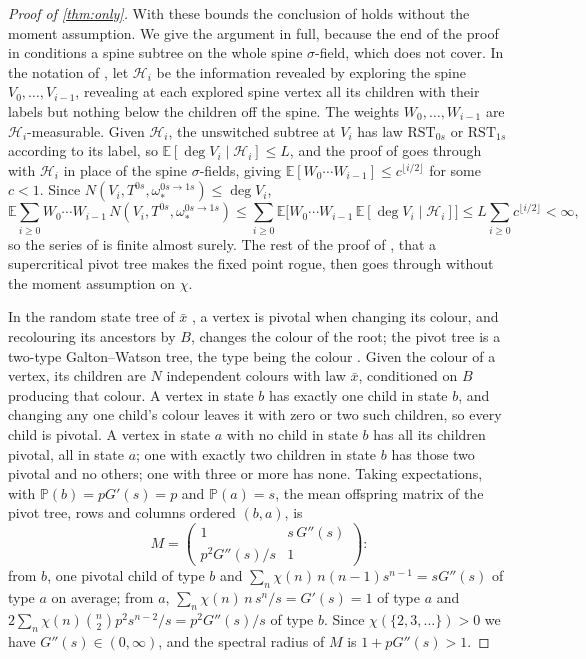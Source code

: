 \documentclass[11pt]{amsart}
\theoremstyle{remark}
\begin{document}
\begin{proof}[Proof of \cref{thm:only}]
With these bounds the conclusion of \cite[Lemma~4.14]{JPS} holds without the moment assumption. We give the argument in full, because the end of the proof in \cite{JPS} conditions a spine subtree on the whole spine $\sigma$-field, which \cite[Proposition~4.9(c)]{JPS} does not cover. In the notation of \cite[Section~4]{JPS}, let $\mathcal H_i$ be the information revealed by exploring the spine $V_0,\dots,V_{i-1}$, revealing at each explored spine vertex all its children with their labels but nothing below the children off the spine. The weights $W_0,\dots,W_{i-1}$ are $\mathcal H_i$-measurable. Given $\mathcal H_i$, the unswitched subtree at $V_i$ has law $\mathrm{RST}_{0s}$ or $\mathrm{RST}_{1s}$ according to its label, so $\mathbb E[\deg V_i\mid\mathcal H_i]\le L$, and the proof of \cite[Lemma~4.12]{JPS} goes through with $\mathcal H_i$ in place of the spine $\sigma$-fields, giving $\mathbb E[W_0\cdots W_{i-1}]\le c^{\lfloor i/2\rfloor}$ for some $c<1$. Since $N(V_i,T^{0s},\omega_*^{0s\to1s})\le\deg V_i$,
\[
\mathbb E\sum_{i\ge0}W_0\cdots W_{i-1}\,N(V_i,T^{0s},\omega_*^{0s\to1s})
\le\sum_{i\ge0}\mathbb E\bigl[W_0\cdots W_{i-1}\,\mathbb E[\deg V_i\mid\mathcal H_i]\bigr]
\le L\sum_{i\ge0}c^{\lfloor i/2\rfloor}<\infty,
\]
so the series of \cite[Lemma~4.14]{JPS} is finite almost surely. The rest of the proof of \cite[Theorem~1.7]{JPS}, that a supercritical pivot tree makes the fixed point rogue, then goes through without the moment assumption on $\chi$.

In the random state tree of $\bar x$ \cite[Section~1.6]{JPS}, a vertex is pivotal when changing its colour, and recolouring its ancestors by $B$, changes the colour of the root; the pivot tree is a two-type Galton--Watson tree, the type being the colour \cite[Proposition~2.4]{JPS}. Given the colour of a vertex, its children are $N$ independent colours with law $\bar x$, conditioned on $B$ producing that colour. A vertex in state $b$ has exactly one child in state $b$, and changing any one child's colour leaves it with zero or two such children, so every child is pivotal. A vertex in state $a$ with no child in state $b$ has all its children pivotal, all in state $a$; one with exactly two children in state $b$ has those two pivotal and no others; one with three or more has none. Taking expectations, with $\mathbb P(b)=pG'(s)=p$ and $\mathbb P(a)=s$, the mean offspring matrix of the pivot tree, rows and columns ordered $(b,a)$, is
\[
M=\begin{pmatrix} 1 & s\,G''(s)\\ p^2G''(s)/s & 1\end{pmatrix}:
\]
from $b$, one pivotal child of type $b$ and $\sum_n\chi(n)\,n(n-1)s^{n-1}=sG''(s)$ of type $a$ on average; from $a$, $\sum_n\chi(n)\,n\,s^n/s=G'(s)=1$ of type $a$ and $2\sum_n\chi(n)\binom n2p^2s^{n-2}/s=p^2G''(s)/s$ of type $b$. Since $\chi(\{2,3,\dots\})>0$ we have $G''(s)\in(0,\infty)$, and the spectral radius of $M$ is $1+pG''(s)>1$.
\end{proof}
\end{document}
